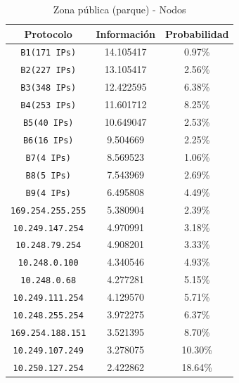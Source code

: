 \documentclass[final,inline,narroweqnarray,a4paper]{ieee}
\begin{document}
\begin{table}[H]
    \begin{center}
        \begin{tabular}{|c|c|c|}
            \hline
            \textbf{Protocolo} & \textbf{Información} & \textbf{Probabilidad} \\ \hline
            \texttt{B1(171 IPs)}    &14.105417        & 0.97\%     \\ \hline
            \texttt{B2(227 IPs)}    &13.105417        & 2.56\%     \\ \hline
            \texttt{B3(348 IPs)}    &12.422595        & 6.38\%     \\ \hline
            \texttt{B4(253 IPs)}    &11.601712        & 8.25\%     \\ \hline
            \texttt{B5(40 IPs)}     &10.649047        & 2.53\%     \\ \hline
            \texttt{B6(16 IPs)}     &9.504669         & 2.25\%     \\ \hline       
            \texttt{B7(4 IPs)}      &8.569523         & 1.06\%     \\ \hline
            \texttt{B8(5 IPs)}      &7.543969         & 2.69\%     \\ \hline
            \texttt{B9(4 IPs)}      &6.495808         & 4.49\%     \\ \hline
            \texttt{169.254.255.255} &5.380904        & 2.39\%     \\ \hline 
            \texttt{10.249.147.254} &4.970991         & 3.18\%     \\ \hline 
            \texttt{10.248.79.254} &4.908201          & 3.33\%     \\ \hline 
            \texttt{10.248.0.100} &4.340546           & 4.93\%     \\ \hline 
            \texttt{10.248.0.68} &4.277281            & 5.15\%     \\ \hline 
            \texttt{10.249.111.254} &4.129570         & 5.71\%     \\ \hline 
            \texttt{10.248.255.254} &3.972275         & 6.37\%     \\ \hline 
            \texttt{169.254.188.151} &3.521395        & 8.70\%     \\ \hline 
            \texttt{10.249.107.249} &3.278075         &10.30\%     \\ \hline 
            \texttt{10.250.127.254} &2.422862         &18.64\%     \\ \hline
        \end{tabular}
        \caption{Zona pública (parque) - Nodos}
        \label{table:parqueS1}
    \end{center}
\end{table}
\end{document}
